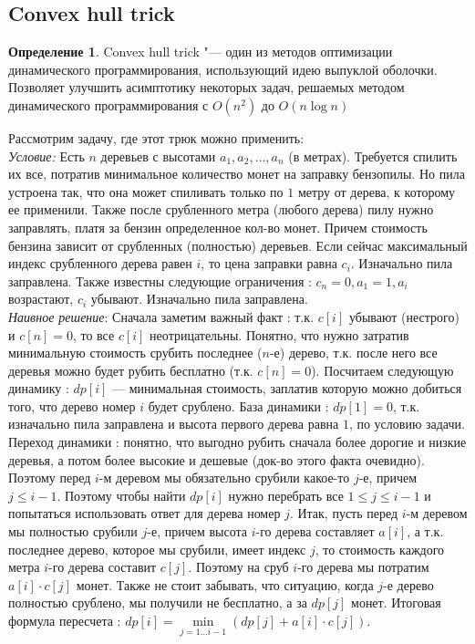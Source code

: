 \documentclass[a4paper, 12pt]{article}
\theoremstyle{plain}
\theoremstyle{definition}
\newtheorem{definition}{Определение}
\theoremstyle{remark}
\begin{document}
\subsection{Convex hull trick}
\begin{definition}
	Convex hull trick "--- один из методов оптимизации динамического программирования, использующий идею выпуклой оболочки. Позволяет улучшить асимптотику некоторых задач, решаемых методом динамического программирования с $O(n^2)$ до $O(n\log n)$
\end{definition}
Рассмотрим задачу, где этот трюк можно применить:\\
\textit{Условие:} Есть $n$ деревьев с высотами $a_1,a_2,\dots,a_n$ (в метрах). Требуется спилить их все, потратив минимальное количество монет на заправку бензопилы. Но пила устроена так, что она может спиливать только по $1$ метру от дерева, к которому ее применили. Также после срубленного метра (любого дерева) пилу нужно заправлять, платя за бензин определенное кол-во монет. Причем стоимость бензина зависит от срубленных (полностью) деревьев. Если сейчас максимальный индекс срубленного дерева равен $i$, то цена заправки равна $c_i$. Изначально пила заправлена. Также известны следующие ограничения : $c_n=0,a_1=1,a_i$ возрастают, $c_i$ убывают. Изначально пила заправлена.\\
\textit{Наивное решение}: Сначала заметим важный факт : т.к. $c[i]$ убывают (нестрого) и $c[n]=0$, то все $c[i]$ неотрицательны. Понятно, что нужно затратив минимальную стоимость срубить последнее ($n$-е) дерево, т.к. после него все деревья можно будет рубить бесплатно (т.к. $c[n]=0$). Посчитаем следующую динамику : $dp[i]$ — минимальная стоимость, заплатив которую можно добиться того, что дерево номер $i$ будет срублено. База динамики : $dp[1]=0$, т.к. изначально пила заправлена и высота первого дерева равна $1$, по условию задачи. Переход динамики : понятно, что выгодно рубить сначала более дорогие и низкие деревья, а потом более высокие и дешевые (док-во этого факта очевидно). Поэтому перед $i$-м деревом мы обязательно срубили какое-то $j$-е, причем $j\leq i-1$. Поэтому чтобы найти $dp[i]$ нужно перебрать все $1\leq j\leq i-1$ и попытаться использовать ответ для дерева номер $j$. Итак, пусть перед $i$-м деревом мы полностью срубили $j$-е, причем высота $i$-го дерева составляет $a[i]$, а т.к. последнее дерево, которое мы срубили, имеет индекс $j$, то стоимость каждого метра $i$-го дерева составит $c[j]$. Поэтому на сруб $i$-го дерева мы потратим $a[i]\cdot c[j]$ монет. Также не стоит забывать, что ситуацию, когда $j$-е дерево полностью срублено, мы получили не бесплатно, а за $dp[j]$ монет. Итоговая формула пересчета : $dp[i]=\min\limits_{j=1\dots i-1}(dp[j]+a[i]\cdot c[j])$.\\
\end{document}
